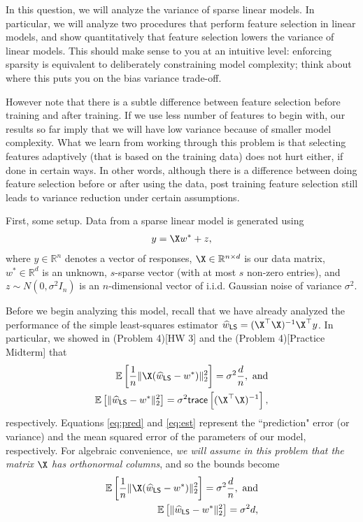 \documentclass[preview]{standalone}
\begin{document}

In this question, we will analyze the variance of sparse linear models. In particular, we will analyze two procedures that perform feature selection in linear models, and show quantitatively that feature selection lowers the variance of linear models.
This should make sense to you at an intuitive level: enforcing sparsity is equivalent to deliberately constraining model complexity; think about where this puts you on the bias variance trade-off.

However note that there is a subtle difference between feature selection before training and after training. 
If we use less number of features to begin with, our results so far imply that we will have low variance because
of smaller model complexity.
What we learn from working through this problem is that selecting features adaptively (that is based on the training data)
does not hurt either, if done in certain ways.
In other words, although there is a difference between doing feature selection before or after using the data, post training feature selection still leads to variance reduction under certain assumptions.


First, some setup. Data from a sparse linear model is generated using
\begin{align*}
y = \X w^* + z,
\end{align*}
where $y \in \mathbb{R}^n$ denotes a vector of responses, $\X \in \mathbb{R}^{n \times d}$ is our data matrix, $w^* \in \mathbb{R}^d$ is an unknown, $s$-sparse vector (with at most $s$ non-zero entries), and $z \sim N(0, \sigma^2 I_n)$ is an $n$-dimensional vector of i.i.d. Gaussian noise of variance $\sigma^2$.

Before we begin analyzing this model, recall that we have already analyzed the performance of the simple least-squares estimator $\widehat{w}_{{\sf LS}} = (\X^\top \X)^{-1} \X^\top y$. In particular, we showed in (Problem 4)[HW 3] and the (Problem 4)[Practice Midterm] that
\begin{align}
\mathbb{E} \left[ \frac{1}{n} \| \X(\widehat{w}_{{\sf LS}} - w^*) \|_2^2 \right] = \sigma^2 \frac{d}{n}, \text{ and} \label{eq:pred} \\
\mathbb{E} \left[ \| \widehat{w}_{{\sf LS}} - w^* \|_2^2 \right] = \sigma^2 \mathsf{trace} \left[(\X^\top \X)^{-1} \right], \label{eq:est}
\end{align}
respectively. Equations \eqref{eq:pred} and \eqref{eq:est} represent the ``prediction" error (or variance) and the mean squared 
error of the parameters of our model, respectively. For algebraic convenience, \emph{we will assume in this problem that the matrix $\X$ has orthonormal columns}, and so the bounds become
\begin{align}
\mathbb{E} \left[ \frac{1}{n} \| \X(\widehat{w}_{{\sf LS}} - w^*) \|_2^2 \right] = \sigma^2 \frac{d}{n}, \text{ and} \label{eq:pred1} \\
\mathbb{E} \left[ \| \widehat{w}_{{\sf LS}} - w^* \|_2^2 \right] = \sigma^2 d, \label{eq:est1}
\end{align}
\end{document}
